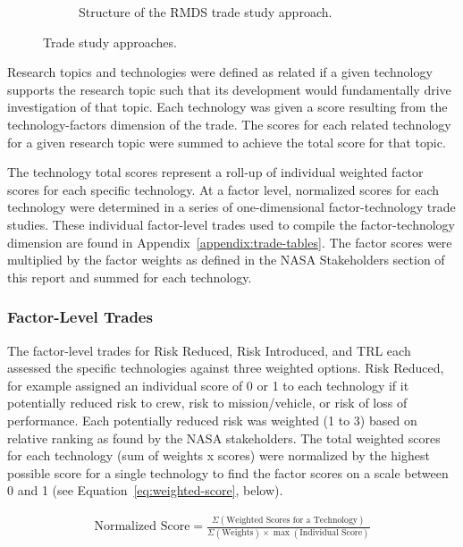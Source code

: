 \begin{figure}[tb!]
\begin{center}
\begin{subfigure}{0.49\textwidth}
            \caption[Structure of the RMDS trade study approach]{Structure of the RMDS trade study approach.}
            \label{figure-hari:tradestudyB}
        \end{subfigure}
        \caption[Trade study approaches]{Trade study approaches.}
        \label{figure-hari:tradestudy}
    \end{center}
\end{figure}

Research topics and technologies were defined as related if a given technology supports the research topic such that its development would fundamentally drive investigation of that topic.
Each technology was given a score resulting from the technology-factors dimension of the trade.
The scores for each related technology for a given research topic were summed to achieve the total score for that topic.

The technology total scores represent a roll-up of individual weighted factor scores for each specific technology.
At a factor level, normalized scores for each technology were determined in a series of one-dimensional factor-technology trade studies.
These individual factor-level trades used to compile the factor-technology dimension are found in Appendix~\ref{appendix:trade-tables}.
The factor scores were multiplied by the factor weights as defined in the NASA Stakeholders section of this report and summed for each technology.

\subsubsection{Factor-Level Trades}
The factor-level trades for Risk Reduced, Risk Introduced, and TRL each assessed the specific technologies against three weighted options.
Risk Reduced, for example assigned an individual score of 0 or 1 to each technology if it potentially reduced risk to crew, risk to mission/vehicle, or risk of loss of performance.
Each potentially reduced risk was weighted (1 to 3) based on relative ranking as found by the NASA stakeholders.
The total weighted scores for each technology (sum of weights x scores) were normalized by the highest possible score for a single technology to find the factor scores on a scale between 0 and 1 (see Equation~\ref{eq:weighted-score}, below).

\begin{align}
    \mbox{Normalized Score} =  \frac{{\Sigma}(\mbox{Weighted Scores for a Technology})}{{\Sigma}(\mbox{Weights}) \times \max(\mbox{Individual Score})}
    \label{eq:weighted-score}
\end{align}

